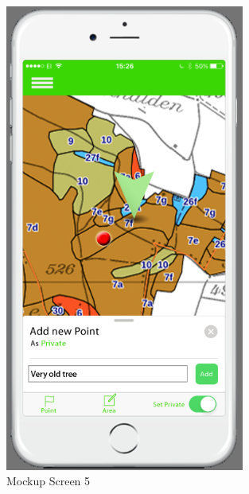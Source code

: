 \begin{figure}[H]
\centering
    \includegraphics[width=0.7\textwidth]{mockup1-5}
    \caption{Mockup Screen 5}
    \label{fig:mesh5}
\end{figure}

